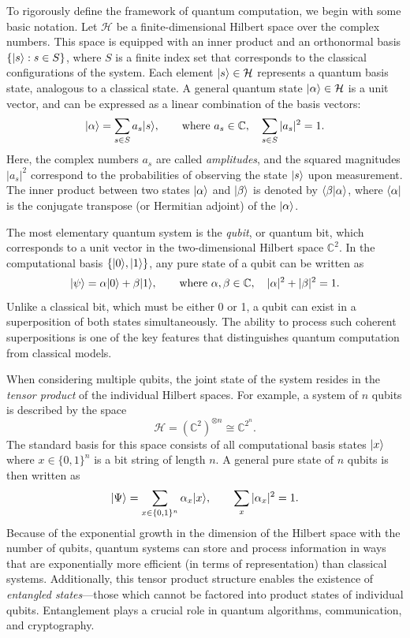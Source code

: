 \documentclass[12pt]{report}
\begin{document}
To rigorously define the framework of quantum computation, we begin with some basic notation. Let $\mathcal{H}$ be a finite-dimensional Hilbert space over the complex numbers. This space is equipped with an inner product and an orthonormal basis $\{\lvert s\rangle : s \in S\}$, where $S$ is a finite index set that corresponds to the classical configurations of the system. Each element $\lvert s\rangle \in \mathcal{H}$ represents a quantum basis state, analogous to a classical state. A general quantum state $\lvert\alpha\rangle \in \mathcal{H}$ is a unit vector, and can be expressed as a linear combination of the basis vectors:
\[
\lvert\alpha\rangle = \sum_{s \in S} a_s \lvert s\rangle, \qquad \text{where } a_s \in \mathbb{C}, \quad \sum_{s \in S} |a_s|^2 = 1.
\]
Here, the complex numbers $a_s$ are called \emph{amplitudes}, and the squared magnitudes $|a_s|^2$ correspond to the probabilities of observing the state $\lvert s\rangle$ upon measurement. The inner product between two states $\lvert\alpha\rangle$ and $\lvert\beta\rangle$ is denoted by $\langle\beta\rvert\alpha\rangle$, where $\langle\alpha\rvert$ is the conjugate transpose (or Hermitian adjoint) of the $\lvert\alpha\rangle$.

The most elementary quantum system is the \emph{qubit}, or quantum bit, which corresponds to a unit vector in the two-dimensional Hilbert space $\mathbb{C}^2$. In the computational basis $\{\lvert0\rangle, \lvert1\rangle\}$, any pure state of a qubit can be written as
\[
\lvert\psi\rangle = \alpha \lvert0\rangle + \beta \lvert1\rangle, \qquad \text{where } \alpha, \beta \in \mathbb{C}, \quad |\alpha|^2 + |\beta|^2 = 1.
\]
Unlike a classical bit, which must be either 0 or 1, a qubit can exist in a superposition of both states simultaneously. The ability to process such coherent superpositions is one of the key features that distinguishes quantum computation from classical models.

When considering multiple qubits, the joint state of the system resides in the \emph{tensor product} of the individual Hilbert spaces. For example, a system of $n$ qubits is described by the space
\[
\mathcal{H} = \left( \mathbb{C}^2 \right)^{\otimes n} \cong \mathbb{C}^{2^n}.
\]
The standard basis for this space consists of all computational basis states $\lvert x\rangle$ where $x \in \{0,1\}^n$ is a bit string of length $n$. A general pure state of $n$ qubits is then written as
\[
\lvert\Psi\rangle = \sum_{x \in \{0,1\}^n} \alpha_x \lvert x\rangle, \qquad \sum_{x} |\alpha_x|^2 = 1.
\]
Because of the exponential growth in the dimension of the Hilbert space with the number of qubits, quantum systems can store and process information in ways that are exponentially more efficient (in terms of representation) than classical systems. Additionally, this tensor product structure enables the existence of \emph{entangled states}—those which cannot be factored into product states of individual qubits. Entanglement plays a crucial role in quantum algorithms, communication, and cryptography.
\end{document}
